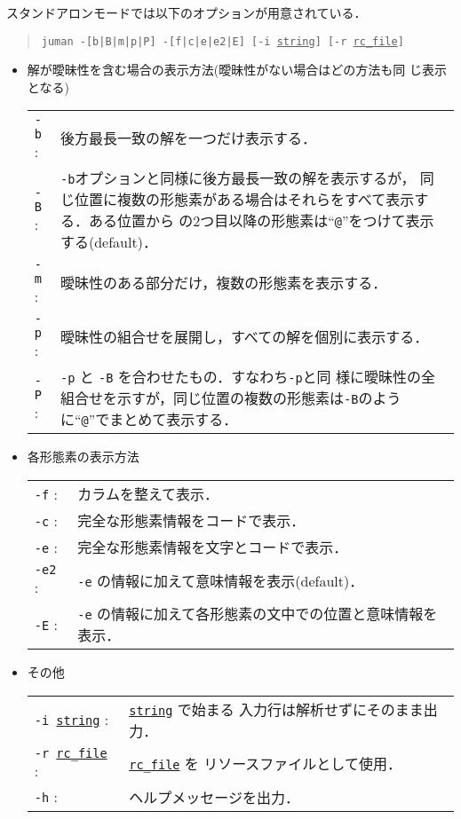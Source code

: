 \documentclass[a4j,titlepage]{jarticle}
\begin{document}
スタンドアロンモードでは以下のオプションが用意されている．
\begin{quote}
  {\tt juman -[b|B|m|p|P] -[f|c|e|e2|E] [-i \underline{string}] 
    [-r \underline{rc\_file}]}
\end{quote}
\begin{itemize}
\item 解が曖昧性を含む場合の表示方法(曖昧性がない場合はどの方法も同
  じ表示となる) \\
  \begin{tabular}{lp{11cm}}
    {\tt -b} : & 後方最長一致の解を一つだけ表示する．\\
    {\tt -B} : & {\tt -b}オプションと同様に後方最長一致の解を表示するが，
    同じ位置に複数の形態素がある場合はそれらをすべて表示する．ある位置から
    の2つ目以降の形態素は``{\tt @}''をつけて表示する(default)．\\
    {\tt -m} : & 曖昧性のある部分だけ，複数の形態素を表示する．\\
    {\tt -p} : & 曖昧性の組合せを展開し，すべての解を個別に表示する．\\
    {\tt -P} : & {\tt -p} と {\tt -B} を合わせたもの．すなわち{\tt -p}と同
    様に曖昧性の全組合せを示すが，同じ位置の複数の形態素は{\tt -B}のよう
    に``{\tt @}''でまとめて表示する．
  \end{tabular}
\item 各形態素の表示方法 \\
  \begin{tabular}{lp{11cm}}
    {\tt -f} : & カラムを整えて表示．\\
    {\tt -c} : & 完全な形態素情報をコードで表示．\\
    {\tt -e} : & 完全な形態素情報を文字とコードで表示．\\
    {\tt -e2} : & {\tt -e} の情報に加えて意味情報を表示(default)．\\
    {\tt -E} : & {\tt -e} の情報に加えて各形態素の文中での位置と意味情報を表示．\\
  \end{tabular}
\item その他 \\
  \begin{tabular}{lp{11cm}}
    {\tt -i\ \underline{string}} : & {\tt \underline{string}} で始まる
    入力行は解析せずにそのまま出力．\\
    {\tt -r\ \underline{rc\_file}} : & {\tt \underline{rc\_file}} を 
      リソースファイルとして使用．\\
    {\tt -h} : & ヘルプメッセージを出力．\\
  \end{tabular}
\end{itemize}
\end{document}

